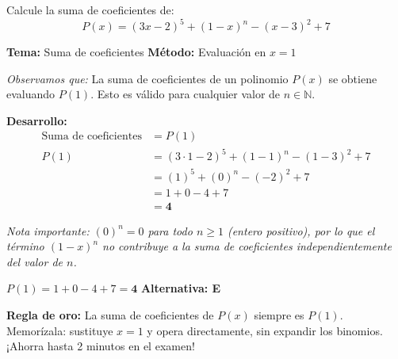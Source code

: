 \begin{tcolorbox}[
  enhanced, breakable,
  colback=GrisClaro, colframe=AzulPizarra,
  fonttitle=\bfseries\sffamily\color{white},
  title={Álgebra — Ejercicio 4},
  arc=3pt, boxrule=0.8pt
]

\begin{problema}
  Calcule la suma de coeficientes de:
  \[
    P(x) = (3x-2)^5 + (1-x)^n - (x-3)^2 + 7
  \]
\end{problema}

\smallskip
\noindent
\textbf{\sffamily\color{AzulMedio}Tema:} Suma de coeficientes \hfill
\textbf{\sffamily\color{AzulMedio}Método:} Evaluación en $x = 1$

\medskip
\noindent\textit{Observamos que:} La suma de coeficientes de un polinomio $P(x)$ se obtiene
evaluando $P(1)$. Esto es válido para cualquier valor de $n \in \mathbb{N}$.

\noindent\textbf{\sffamily Desarrollo:}
\begin{align*}
  \text{Suma de coeficientes} &= P(1) \\[6pt]
  P(1) &= (3\cdot1 - 2)^5 + (1-1)^n - (1-3)^2 + 7 \\[4pt]
       &= (1)^5 + (0)^n - (-2)^2 + 7 \\[4pt]
       &= 1 + 0 - 4 + 7 \\[4pt]
       &= \mathbf{4}
\end{align*}

\noindent\textit{Nota importante: $(0)^n = 0$ para todo $n \geq 1$ (entero positivo),
por lo que el término $(1-x)^n$ no contribuye a la suma de coeficientes
independientemente del valor de $n$.}

\begin{tcolorbox}[
  colback=AzulClaro!60, colframe=AzulPizarra,
  arc=2pt, boxrule=0.8pt, left=8pt, right=8pt
]
\centering
$\displaystyle P(1) = 1 + 0 - 4 + 7 = \mathbf{4}$
\quad\textbf{Alternativa: E}
\end{tcolorbox}

\begin{cajatip}
\textbf{Regla de oro:} La suma de coeficientes de $P(x)$ siempre es $P(1)$.
Memorízala: sustituye $x=1$ y opera directamente, sin expandir los binomios.
¡Ahorra hasta 2 minutos en el examen!
\end{cajatip}

\end{tcolorbox}

\vspace{0.4cm}

